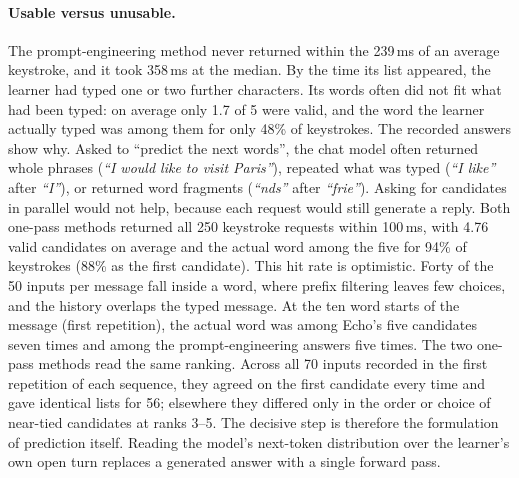 \documentclass[11pt,a4paper]{article}
\begin{document}
\paragraph{Usable versus unusable.} The prompt-engineering method never returned within the 239\,ms of an average keystroke, and it took 358\,ms at the median. By the time its list appeared, the learner had typed one or two further characters. Its words often did not fit what had been typed: on average only 1.7 of 5 were valid, and the word the learner actually typed was among them for only 48\% of keystrokes. The recorded answers show why. Asked to ``predict the next words'', the chat model often returned whole phrases (\emph{``I would like to visit Paris''}), repeated what was typed (\emph{``I like''} after \emph{``I''}), or returned word fragments (\emph{``nds''} after \emph{``frie''}). Asking for candidates in parallel would not help, because each request would still generate a reply. Both one-pass methods returned all 250 keystroke requests within 100\,ms, with 4.76 valid candidates on average and the actual word among the five for 94\% of keystrokes (88\% as the first candidate). This hit rate is optimistic. Forty of the 50 inputs per message fall inside a word, where prefix filtering leaves few choices, and the history overlaps the typed message. At the ten word starts of the message (first repetition), the actual word was among Echo's five candidates seven times and among the prompt-engineering answers five times. The two one-pass methods read the same ranking. Across all 70 inputs recorded in the first repetition of each sequence, they agreed on the first candidate every time and gave identical lists for 56; elsewhere they differed only in the order or choice of near-tied candidates at ranks 3--5. The decisive step is therefore the formulation of prediction itself. Reading the model's next-token distribution over the learner's own open turn replaces a generated answer with a single forward pass.
\end{document}
